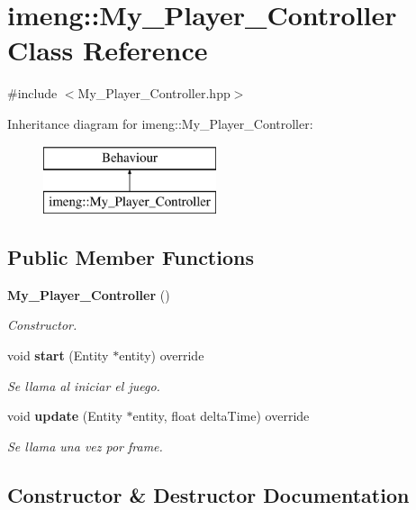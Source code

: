 \section{imeng\+::My\+\_\+\+Player\+\_\+\+Controller Class Reference}
\label{classimeng_1_1_my___player___controller}


{\ttfamily \#include $<$My\+\_\+\+Player\+\_\+\+Controller.\+hpp$>$}

Inheritance diagram for imeng\+::My\+\_\+\+Player\+\_\+\+Controller\+:\begin{figure}[H]
\begin{center}
\leavevmode
\includegraphics[height=2.000000cm]{classimeng_1_1_my___player___controller}
\end{center}
\end{figure}
\subsection*{Public Member Functions}
\begin{DoxyCompactItemize}
\item 
\textbf{ My\+\_\+\+Player\+\_\+\+Controller} ()
\begin{DoxyCompactList}\small\item\em Constructor. \end{DoxyCompactList}\item 
void \textbf{ start} (Entity $\ast$entity) override
\begin{DoxyCompactList}\small\item\em Se llama al iniciar el juego. \end{DoxyCompactList}\item 
void \textbf{ update} (Entity $\ast$entity, float delta\+Time) override
\begin{DoxyCompactList}\small\item\em Se llama una vez por frame. \end{DoxyCompactList}\end{DoxyCompactItemize}


\subsection{Constructor \& Destructor Documentation}
\mbox{\label{classimeng_1_1_my___player___controller_ad7dad06851c77d174a59e0c5d35c3b90}} 
